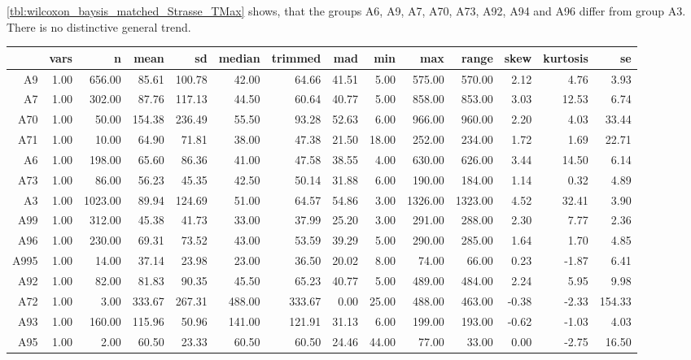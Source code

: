 \cref{tbl:wilcoxon_baysis_matched_Strasse_TMax} shows, that the groups A6, A9, A7, A70, A73, A92, A94 and A96 differ from group A3. There is no distinctive general trend.
\begin{table}[ht!]
	\tiny
	\centering
  \begin{tabular}{rrrrrrrrrrrrrr}
    \hline
    & vars & n & mean & sd & median & trimmed & mad & min & max & range & skew & kurtosis & se \\ 
    \hline
    A9   & 1.00 & 656.00 & 85.61 & 100.78 & 42.00 & 64.66 & 41.51 & 5.00 & 575.00 & 570.00 & 2.12 & 4.76 & 3.93 \\ 
    A7   & 1.00 & 302.00 & 87.76 & 117.13 & 44.50 & 60.64 & 40.77 & 5.00 & 858.00 & 853.00 & 3.03 & 12.53 & 6.74 \\ 
    A70  & 1.00 & 50.00 & 154.38 & 236.49 & 55.50 & 93.28 & 52.63 & 6.00 & 966.00 & 960.00 & 2.20 & 4.03 & 33.44 \\ 
    A71  & 1.00 & 10.00 & 64.90 & 71.81 & 38.00 & 47.38 & 21.50 & 18.00 & 252.00 & 234.00 & 1.72 & 1.69 & 22.71 \\ 
    A6   & 1.00 & 198.00 & 65.60 & 86.36 & 41.00 & 47.58 & 38.55 & 4.00 & 630.00 & 626.00 & 3.44 & 14.50 & 6.14 \\ 
    A73  & 1.00 & 86.00 & 56.23 & 45.35 & 42.50 & 50.14 & 31.88 & 6.00 & 190.00 & 184.00 & 1.14 & 0.32 & 4.89 \\ 
    A3   & 1.00 & 1023.00 & 89.94 & 124.69 & 51.00 & 64.57 & 54.86 & 3.00 & 1326.00 & 1323.00 & 4.52 & 32.41 & 3.90 \\ 
    A99  & 1.00 & 312.00 & 45.38 & 41.73 & 33.00 & 37.99 & 25.20 & 3.00 & 291.00 & 288.00 & 2.30 & 7.77 & 2.36 \\ 
    A96  & 1.00 & 230.00 & 69.31 & 73.52 & 43.00 & 53.59 & 39.29 & 5.00 & 290.00 & 285.00 & 1.64 & 1.70 & 4.85 \\ 
    A995 & 1.00 & 14.00 & 37.14 & 23.98 & 23.00 & 36.50 & 20.02 & 8.00 & 74.00 & 66.00 & 0.23 & -1.87 & 6.41 \\ 
    A92  & 1.00 & 82.00 & 81.83 & 90.35 & 45.50 & 65.23 & 40.77 & 5.00 & 489.00 & 484.00 & 2.24 & 5.95 & 9.98 \\ 
    A72  & 1.00 & 3.00 & 333.67 & 267.31 & 488.00 & 333.67 & 0.00 & 25.00 & 488.00 & 463.00 & -0.38 & -2.33 & 154.33 \\ 
    A93  & 1.00 & 160.00 & 115.96 & 50.96 & 141.00 & 121.91 & 31.13 & 6.00 & 199.00 & 193.00 & -0.62 & -1.03 & 4.03 \\ 
    A95  & 1.00 & 2.00 & 60.50 & 23.33 & 60.50 & 60.50 & 24.46 & 44.00 & 77.00 & 33.00 & 0.00 & -2.75 & 16.50 \\ 

\end{tabular}
\end{table}
